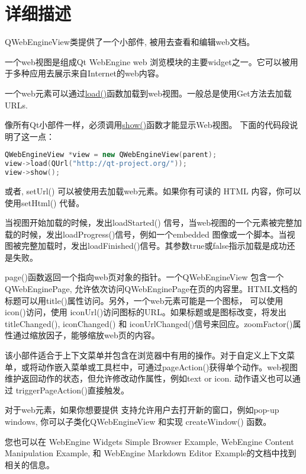 \section{详细描述}

QWebEngineView类提供了一个小部件, 被用去查看和编辑web文档。

一个web视图是组成Qt WebEngine web 浏览模块的主要widget之一。它可以被用于多种应用去展示来自Internet的web内容。

一个web元素可以通过\href{https://github.com/QtDocumentCN/QtDocumentCN/blob/master/Src/W/QWebEngineView}{load()}函数加载到web视图。一般总是使用Get方法去加载URLs.

像所有Qt小部件一样，必须调用\href{https://github.com/QtDocumentCN/QtDocumentCN/blob/master/Src/W/QWebEngineView}{show()}函数才能显示Web视图。 下面的代码段说明了这一点：

\begin{lstlisting}[language=C++]
QWebEngineView *view = new QWebEngineView(parent);
view->load(QUrl("http://qt-project.org/"));
view->show();
\end{lstlisting}

或者, setUrl() 可以被使用去加载web元素。如果你有可读的 HTML 内容，你可以使用setHtml() 代替。

当视图开始加载的时候，发出loadStarted() 信号，当web视图的一个元素被完整加载的时候，发出loadProgress()信号，例如一个embedded 图像或一个脚本。当视图被完整加载时，发出loadFinished()信号。其参数true或false指示加载是成功还是失败。

page()函数返回一个指向web页对象的指针。一个QWebEngineView 包含一个QWebEnginePage, 允许依次访问QWebEnginePage在页的内容里。HTML文档的标题可以用title()属性访问。另外，一个web元素可能是一个图标， 可以使用icon()访问，使用 iconUrl()访问图标的URL。如果标题或是图标改变，将发出titleChanged(), iconChanged() 和 iconUrlChanged()信号来回应。zoomFactor()属性通过缩放因子，能够缩放web页的内容。

该小部件适合于上下文菜单并包含在浏览器中有用的操作。对于自定义上下文菜单，或将动作嵌入菜单或工具栏中，可通过pageAction()获得单个动作。web视图维护返回动作的状态，但允许修改动作属性，例如text or icon. 动作语义也可以通过 triggerPageAction()直接触发。

对于web元素，如果你想要提供 支持允许用户去打开新的窗口，例如pop-up windows, 你可以子类化QWebEngineView 和实现 createWindow() 函数。

您也可以在 WebEngine Widgets Simple Browser Example, WebEngine Content Manipulation Example, 和 WebEngine Markdown Editor Example的文档中找到相关的信息。

